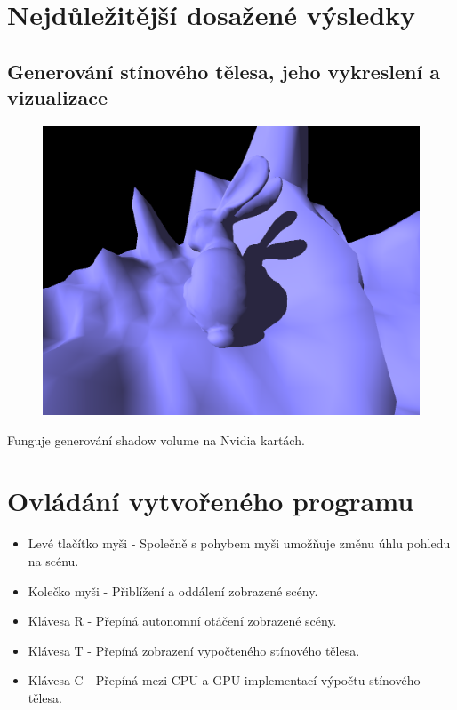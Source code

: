 \documentclass[11pt,a4paper]{article}
\begin{document}
\section{Nejdůležitější dosažené výsledky}

\subsection {Generování stínového tělesa, jeho vykreslení a vizualizace}

\begin{figure}[h]
	\captionsetup{type=figure}
	\includegraphics[width=\textwidth]{images/bunny.png}
\end{figure}

Funguje generování shadow volume na Nvidia kartách.

\section{Ovládání vytvořeného programu}

\begin{itemize}
	\item Levé tlačítko myši - Společně s pohybem myši umožňuje změnu úhlu pohledu na scénu.
	\item Kolečko myši - Přiblížení a oddálení zobrazené scény.
	\item Klávesa R - Přepíná autonomní otáčení zobrazené scény.
	\item Klávesa T - Přepíná zobrazení vypočteného stínového tělesa.
	\item Klávesa C - Přepíná mezi CPU a GPU implementací výpočtu stínového tělesa.
\end{itemize}
\end{document}
